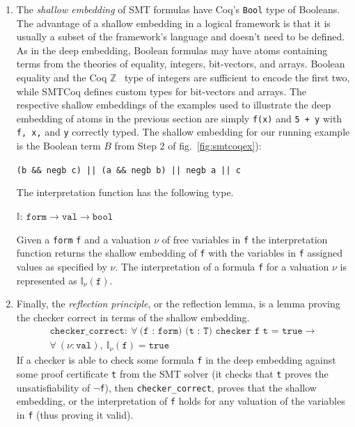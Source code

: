 \documentclass{article}
\begin{document}
	\begin{enumerate}
	\item The \emph{shallow embedding} of SMT formulas
	have Coq's \texttt{Bool} type of 
	Booleans. The advantage of a 
	shallow embedding in a logical 
	framework is that it is usually 
	a subset of the framework's language
	and doesn't need to be defined. 
	As in the deep embedding, Boolean
	formulas may have atoms containing 
	terms from the theories of 
	equality, integers, bit-vectors,
	and arrays. Boolean equality and
	the Coq $\mathbb{Z}$~\cite{CoqZ} type 
	of integers are sufficient to encode
	the first two, while SMTCoq 
	defines custom types for 
	bit-vectors and arrays. The
	respective shallow embeddings of
	the examples used to illustrate 
	the deep embedding of atoms in the 
	previous section are simply 
	\texttt{f(x)} and \texttt{5 + y} 
	with \texttt{f, x,} and \texttt{y}
	correctly typed. The shallow 
	embedding for our running example 
	is the Boolean term $B$
	from Step 2 of fig.~\ref{fig:smtcoqex}):
	\begin{center}
		\texttt{(b \&\& negb c) || (a 
			\&\& negb b) || negb a || c}
	\end{center}
	The interpretation function 
	has the following type.
	\begin{center}
		$\mathbb{I} :\ \texttt{form} \to 
		\texttt{val} \to \texttt{bool}$
	\end{center}
	Given a \texttt{form} \texttt{f} 
	and a valuation $\nu$ of free 
	variables in \texttt{f} 
	the interpretation function returns 
	the shallow embedding of \texttt{f}
	with the variables in \texttt{f} 
	assigned values as specified by 
	$\nu$. The interpretation of a 
	formula \texttt{f} for a valuation 
	$\nu$ is represented as $\mathbb{I}_{\nu}
	(\texttt{f})$. 
	
	\item Finally, the 
	\emph{reflection principle}, 
	or the reflection lemma, is a 
	lemma proving the checker correct
	in terms of the shallow embedding.
	\begin{align*}
	\texttt{checker\_correct} :\ 
	\forall\ \texttt{(f : form)
		(t : T) checker f t = true} \to \\
	\forall\ (\nu : \texttt{val}),\ 
	\mathbb{I}_{\nu}(\texttt{f}) = 
	\texttt{true}
	\end{align*}
	If a checker is able to check 
	some formula \texttt{f} in 
	the deep embedding against
	some proof certificate \texttt{t} from 
	the SMT solver (it checks that 
	\texttt{t} proves the unsatisfiability
	of \texttt{$\neg$f}), then 
	\texttt{checker\_correct},
	proves that the shallow embedding,
	or the interpretation of \texttt{f}
	holds for any valuation of the 
	variables in \texttt{f} (thus 
	proving it valid). 
	

\end{enumerate}
\end{document}
